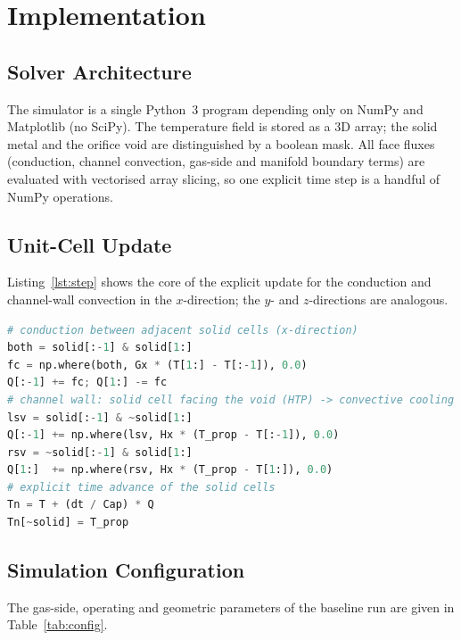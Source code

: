 \documentclass[11pt,a4paper]{article}
\begin{document}
\section{Implementation}
\subsection{Solver Architecture}
The simulator is a single Python~3 program depending only on NumPy and
Matplotlib (no SciPy). The temperature field is stored as a 3D array; the solid
metal and the orifice void are distinguished by a boolean mask. All face fluxes
(conduction, channel convection, gas-side and manifold boundary terms) are
evaluated with vectorised array slicing, so one explicit time step is a handful
of NumPy operations.

\subsection{Unit-Cell Update}
Listing~\ref{lst:step} shows the core of the explicit update for the conduction
and channel-wall convection in the $x$-direction; the $y$- and $z$-directions are
analogous.

\begin{lstlisting}[language=Python,caption={Vectorised flux assembly (excerpt).},label={lst:step}]
# conduction between adjacent solid cells (x-direction)
both = solid[:-1] & solid[1:]
fc = np.where(both, Gx * (T[1:] - T[:-1]), 0.0)
Q[:-1] += fc; Q[1:] -= fc
# channel wall: solid cell facing the void (HTP) -> convective cooling
lsv = solid[:-1] & ~solid[1:]
Q[:-1] += np.where(lsv, Hx * (T_prop - T[:-1]), 0.0)
rsv = ~solid[:-1] & solid[1:]
Q[1:]  += np.where(rsv, Hx * (T_prop - T[1:]), 0.0)
# explicit time advance of the solid cells
Tn = T + (dt / Cap) * Q
Tn[~solid] = T_prop
\end{lstlisting}

\subsection{Simulation Configuration}
The gas-side, operating and geometric parameters of the baseline run are given in
Table~\ref{tab:config}.
\end{document}
